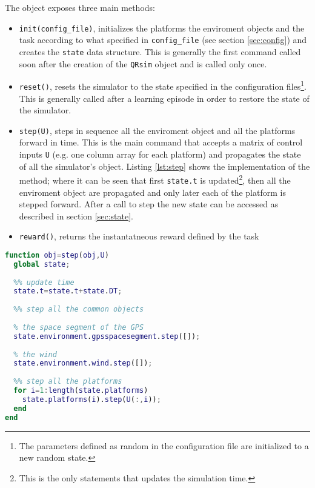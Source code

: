 \documentclass[a4paper,11pt]{report}
\newcommand{\sname}{QRsim\xspace}
\begin{document}
The object exposes three main methods:
\begin{itemize}
 \item \texttt{init(config\_file)}, initializes the platforms the enviroment objects and the task according to what specified in \texttt{config\_file} (see section \ref{sec:config}) and creates the \texttt{state} data structure. This is generally the first command called soon after the creation of the \texttt{\sname} object and is called only once.
 \item \texttt{reset()}, resets the simulator to the state specified in the configuration files\footnote{The parameters defined as random in the configuration file are initialized to a new random state.}. This is generally called after a learning episode in order to restore the state of the simulator. 
 \item \texttt{step(U)}, steps in sequence all the enviroment object and all the platforms forward in time. This is the main command that accepts a matrix of control inputs \texttt{U} (e.g. one column array for each platform) and propagates the state of all the simulator's object. Listing \ref{lst:step} shows the implementation of the method; where it can be seen that first \texttt{state.t} is updated\footnote{This is the only statements that updates the simulation time.}, then all the enviroment object are propagated and only later each of the platform is stepped forward.
 After a call to step the new state can be accessed as described in section \ref{sec:state}.
 \item \texttt{reward()}, returns the instantatneous reward defined by the task
\end{itemize}


\begin{lstlisting}[float=ht!bp,caption=\sname step() method,language=Matlab,frame=lines,label=lst:step,firstnumber=100]
function obj=step(obj,U)
  global state;
           
  %% update time
  state.t=state.t+state.DT;
                        
  %% step all the common objects
            
  % the space segment of the GPS
  state.environment.gpsspacesegment.step([]);
            
  % the wind
  state.environment.wind.step([]);
            
  %% step all the platforms            
  for i=1:length(state.platforms)
    state.platforms(i).step(U(:,i));
  end
end
\end{lstlisting}
\end{document}
